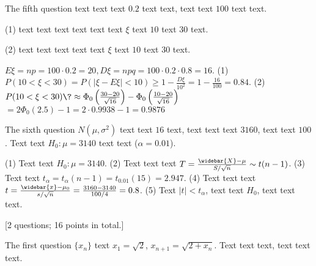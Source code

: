 \documentclass[12pt,math=all]{randexam}
\begin{document}
\vfill

\newpage

\begin{question}
The fifth question text text text $0.2$ text text, text text $100$ text text.\par
(1) text text text text text text $\xi$ text $10$ text $30$ text.\par
(2) text text text text text $\xi$ text $10$ text $30$ text.
\end{question}

\smallskip

\begin{solution}
$E\xi = n p = 100 \cdot 0.2 = 20, D\xi = n p q = 100 \cdot 0.2 \cdot 0.8 = 16$. 
(1) $P (10 < \xi < 30) = P (|\xi - E\xi| < 10) \ge 1 - \frac{D\xi}{10^2}
     = 1 - \frac{16}{100} = 0.84$. 
(2) $P (10 < \xi < 30) \? \approx \Phi_0\left(\frac{30 - 20}{\sqrt{16}}\right)
         - \Phi_0\left(\frac{10 - 20}{\sqrt{16}}\right)$ 
      \+ $= 2 \Phi_0(2.5) - 1 = 2 \cdot 0.9938 - 1 =0.9876$ 
\end{solution}

\vfill

\begin{question}
The sixth question $N(\mu,\sigma^2)$ text text $16$ text, text text text $3160$, text text $100$.
Text text $H_0:\mu=3140$ text text ($\alpha = 0.01$).
\end{question}

\smallskip

\begin{solution}
(1) Text text $H_0 : \mu = 3140$. 
(2) Text text text $T = \frac{\widebar{X}-\mu}{S / \sqrt{n}} \sim t(n-1)$. 
(3) Text text $t_{\alpha} = t_{\alpha} (n - 1) = t_{0.01} (15) =2.947$. 
(4) Text text text $t = \frac{\widebar{x} - \mu_0}{s/\sqrt{n}} =\frac{3160-3140}{100/4} = 0.8$.
(5) Text $| t | < t_{\alpha}$, text text $H_0$, text text text. 
\end{solution}

\vfill

\newpage

[2 questions; 16 points in total.]


\begin{question}[points=9]
The first question $\{x_n\}$ text $x_1=\sqrt2$, $x_{n+1}=\sqrt{2+x_n}$.
Text text text, text text text.
\end{question}
\end{document}
